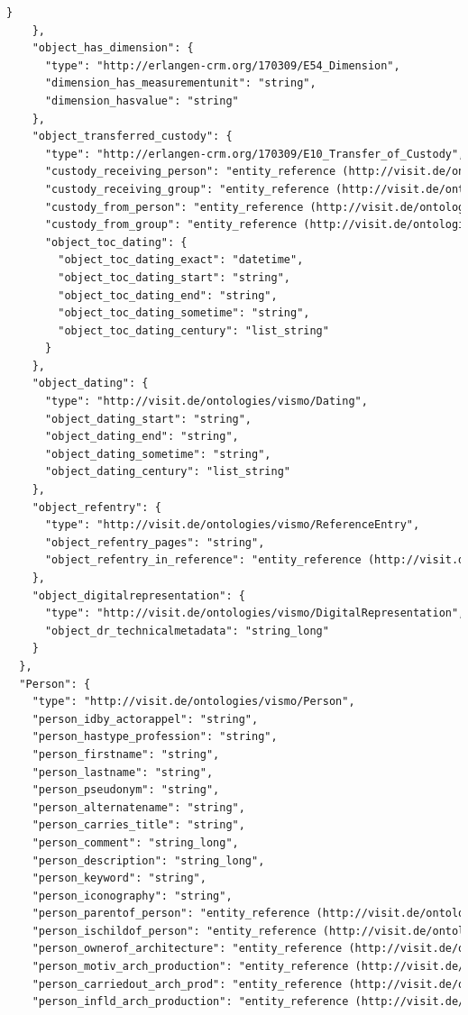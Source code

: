 \begin{lstlisting}[caption={JSON \q{Schema} der ViSIT Daten, die über die REST API ausgespielt werden.},label={lst:json},captionpos=b,language=xml]
      }
    },
    "object_has_dimension": {
      "type": "http://erlangen-crm.org/170309/E54_Dimension",
      "dimension_has_measurementunit": "string",
      "dimension_hasvalue": "string"
    },
    "object_transferred_custody": {
      "type": "http://erlangen-crm.org/170309/E10_Transfer_of_Custody",
      "custody_receiving_person": "entity_reference (http://visit.de/ontologies/vismo/Person)",
      "custody_receiving_group": "entity_reference (http://visit.de/ontologies/vismo/Group)",
      "custody_from_person": "entity_reference (http://visit.de/ontologies/vismo/Person)",
      "custody_from_group": "entity_reference (http://visit.de/ontologies/vismo/Group)",
      "object_toc_dating": {
        "object_toc_dating_exact": "datetime",
        "object_toc_dating_start": "string",
        "object_toc_dating_end": "string",
        "object_toc_dating_sometime": "string",
        "object_toc_dating_century": "list_string"
      }
    },
    "object_dating": {
      "type": "http://visit.de/ontologies/vismo/Dating",
      "object_dating_start": "string",
      "object_dating_end": "string",
      "object_dating_sometime": "string",
      "object_dating_century": "list_string"
    },
    "object_refentry": {
      "type": "http://visit.de/ontologies/vismo/ReferenceEntry",
      "object_refentry_pages": "string",
      "object_refentry_in_reference": "entity_reference (http://visit.de/ontologies/vismo/Reference)"
    },
    "object_digitalrepresentation": {
      "type": "http://visit.de/ontologies/vismo/DigitalRepresentation",
      "object_dr_technicalmetadata": "string_long"
    }
  },
  "Person": {
    "type": "http://visit.de/ontologies/vismo/Person",
    "person_idby_actorappel": "string",
    "person_hastype_profession": "string",
    "person_firstname": "string",
    "person_lastname": "string",
    "person_pseudonym": "string",
    "person_alternatename": "string",
    "person_carries_title": "string",
    "person_comment": "string_long",
    "person_description": "string_long",
    "person_keyword": "string",
    "person_iconography": "string",
    "person_parentof_person": "entity_reference (http://visit.de/ontologies/vismo/Person)",
    "person_ischildof_person": "entity_reference (http://visit.de/ontologies/vismo/Person)",
    "person_ownerof_architecture": "entity_reference (http://visit.de/ontologies/vismo/Architecture)",
    "person_motiv_arch_production": "entity_reference (http://visit.de/ontologies/vismo/Architecture)",
    "person_carriedout_arch_prod": "entity_reference (http://visit.de/ontologies/vismo/Architecture)",
    "person_infld_arch_production": "entity_reference (http://visit.de/ontologies/vismo/Architecture)",

\end{lstlisting}
